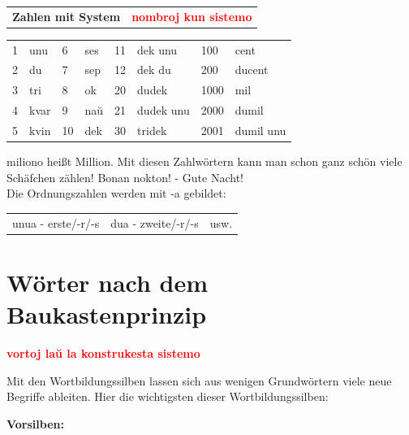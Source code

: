 \documentclass{leaflet}
\begin{document}
\clearpage

\vspace{-.6cm}

\begin{tabular}{lr}
	\textbf{\large{Zahlen mit System}} & \textbf{\large \textcolor{red}{nombroj kun sistemo}}
\end{tabular}

\vspace{-.0cm}

\begingroup
\setlength{\tabcolsep}{5pt} %
\renewcommand{\arraystretch}{0.9} %
\begin{tabular}{llllllll}
1 &unu & 6 &ses & 11 &dek unu &  100& cent \\
2 &du  & 7 &sep & 12 &dek du& 200& ducent \\
3 &tri & 8 &ok  & 20 &dudek & 1000& mil \\
4 &kvar& 9 &naŭ & 21 &dudek unu & 2000& dumil \\
5 &kvin& 10 &dek& 30 &tridek& 2001& dumil unu
\end{tabular}
\endgroup

miliono heißt Million. Mit diesen Zahlwörtern kann man schon ganz schön viele Schäfchen zählen!
Bonan nokton! - Gute Nacht! \\
Die Ordnungszahlen werden mit -a gebildet:

\begin{tabular}{lll}
unua - erste/-r/-s & dua - zweite/-r/-s & usw. 
\end{tabular}

\vspace{-.6cm}

\section{Wörter nach dem Baukastenprinzip}

\vspace{-.2cm}

\begin{flushright}
\textbf{\large \textcolor{red}{vortoj laŭ la konstrukesta sistemo}}
\end{flushright}

\vspace{-.1cm}

Mit den Wortbildungssilben lassen sich aus wenigen Grundwörtern viele neue Begriffe ableiten. Hier die wichtigsten dieser Wortbildungssilben:

\textbf{Vorsilben:}
\end{document}
